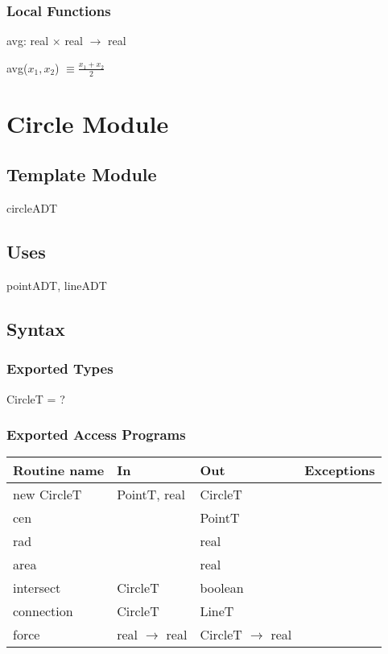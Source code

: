 \documentclass[12pt,fleqn]{article}
\begin{document}
\subsubsection*{Local Functions}

avg: real $\times$ real $\rightarrow$ real

\noindent avg($x_1, x_2$) $\equiv \frac{x_1 + x_2}{2}$

\newpage

\section* {Circle Module}

\subsection* {Template Module}

circleADT

\subsection* {Uses}

pointADT, lineADT

\subsection* {Syntax}

\subsubsection* {Exported Types}

CircleT = ?

\subsubsection* {Exported Access Programs}

\begin{tabular}{| l | l | l | l |}
\hline
\textbf{Routine name} & \textbf{In} & \textbf{Out} & \textbf{Exceptions}\\
\hline
new CircleT & PointT, real & CircleT & ~\\
\hline
cen & ~ & PointT & ~\\
\hline
rad & ~ & real & ~\\
\hline 
area & ~ & real & ~\\
\hline 
intersect & CircleT & boolean & ~\\
\hline
connection & CircleT & LineT & ~\\
\hline
force & real $\rightarrow$ real & CircleT $\rightarrow$ real & ~\\
\hline

\end{tabular}
\end{document}
